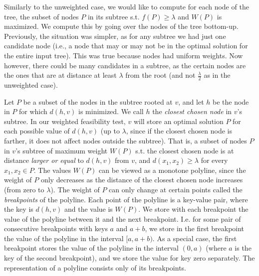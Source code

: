 \documentclass[a4paper,UKenglish]{lipics-v2016}
\theoremstyle{plain}
\begin{document}
Similarly to the unweighted case, we would like to compute for each node of the tree, the subset of nodes $P$ in its subtree  s.t. $f(P) \geq \lambda$ and $W(P)$ is maximized. We compute this by going over the nodes of the tree bottom-up. Previously, the situation was simpler, as for any subtree we had just one candidate node (i.e., a node that may or may not be in the optimal solution for the entire input tree). This was true because nodes had uniform weights. Now however, there could be many candidates in a subtree, as the certain nodes are the ones that are at distance at least $\lambda$ from the root (and not $\frac{\lambda}{2}$ as in the unweighted case).

Let $P$ be a subset of the nodes in the subtree rooted at $v$, and let $h$ be the node in $P$ for which $d(h,v)$ is minimized. We call $h$ the {\em closest chosen node} in $v$'s subtree. In our weighted feasibility test, $v$ will store an optimal solution $P$ for each possible value of $d(h,v)$ (up to $\lambda$, since if the closest chosen node is farther, it does not affect nodes outside the subtree). That is, a subset of nodes $P$ in $v$'s subtree of maximum weight $W(P)$ s.t. the closest chosen node is at distance {\em larger or equal} to $d(h,v)$ from $v$, and $d(x_1,x_2) \geq \lambda$ for every  $x_1,x_2\in P$. 
The values $W(P)$ can be viewed as a monotone polyline, since the weight of $P$ only decreases as the distance of the closest chosen node increases (from zero to $\lambda$). The weight of $P$ can only change at certain points called the {\em breakpoints} of the polyline. Each point of the polyline is a key-value pair, where the key is $d(h,v)$ and the value is $W(P)$. We store with each breakpoint the value of the polyline between it and the next breakpoint. I.e. for some pair of consecutive breakpoints with keys $a$ and $a+b$, we store in the first breakpoint the value of the polyline in the interval $[a,a+b)$. As a special case, the first breakpoint stores the value of the polyline in the interval $(0,a)$ (where $a$ is the key of the second breakpoint), and we store the value for key zero separately. The representation of a polyline consists only of its breakpoints.
\end{document}
